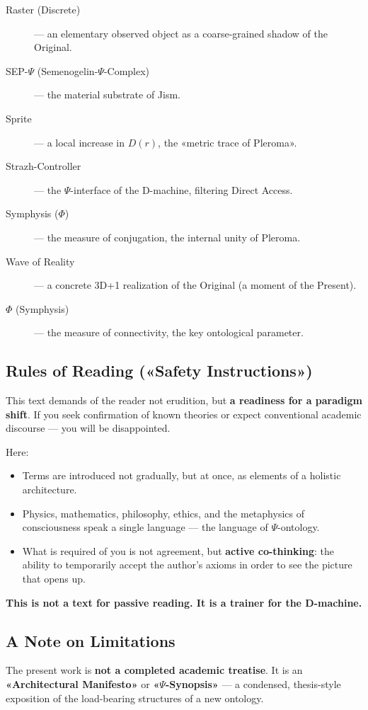\documentclass[a4paper,12pt]{article}
\begin{document}
\begin{description}
		\item[Raster (Discrete)] — an elementary observed object as a coarse-grained shadow of the Original.
		\item[SEP-$\Psi$ (Semenogelin-$\Psi$-Complex)] — the material substrate of Jism.
		\item[Sprite] — a local increase in $D(r)$, the «metric trace of Pleroma».
		\item[Strazh-Controller] — the $\Psi$-interface of the D-machine, filtering Direct Access.
		\item[Symphysis ($\Phi$)] — the measure of conjugation, the internal unity of Pleroma.
		\item[Wave of Reality] — a concrete 3D+1 realization of the Original (a moment of the Present).
		\item[$\Phi$ (Symphysis)] — the measure of connectivity, the key ontological parameter.
	\end{description}
	
	\subsection{Rules of Reading («Safety Instructions»)}
	
	This text demands of the reader not erudition, but \textbf{a readiness for a paradigm shift}. If you seek confirmation of known theories or expect conventional academic discourse — you will be disappointed.
	
	Here:
	\begin{itemize}
		\item Terms are introduced not gradually, but at once, as elements of a holistic architecture.
		\item Physics, mathematics, philosophy, ethics, and the metaphysics of consciousness speak a single language — the language of $\Psi$-ontology.
		\item What is required of you is not agreement, but \textbf{active co-thinking}: the ability to temporarily accept the author's axioms in order to see the picture that opens up.
	\end{itemize}
	
	\textbf{This is not a text for passive reading. It is a trainer for the D-machine.}
	
	\subsection{A Note on Limitations}
	
	The present work is \textbf{not a completed academic treatise}. It is an \textbf{«Architectural Manifesto»} or \textbf{«$\Psi$-Synopsis»} — a condensed, thesis-style exposition of the load-bearing structures of a new ontology.
	
\end{document}
